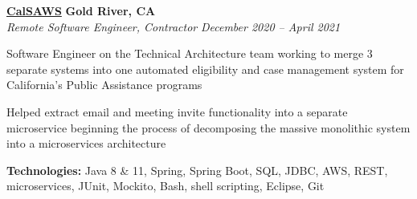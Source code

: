 %
    \headerrow
        {\textbf{\href{https://www.calsaws.org/}{CalSAWS}}}
        {\textbf{Gold River, CA}}
    \\
    \headerrow
        {\emph{Remote Software Engineer, Contractor}}
        {\emph{December 2020 -- April 2021}}
    \begin{itemize*}
        \item Software Engineer on the Technical Architecture team working to merge 3 separate systems into
            one automated eligibility and case management system for California's Public Assistance programs
        \item Helped extract email and meeting invite functionality into a separate microservice beginning the process of decomposing
            the massive monolithic system into a microservices architecture
    \end{itemize*}

    \hspace{1.0em}
        {\textbf{Technologies:} Java 8 \& 11, Spring, Spring Boot, SQL, JDBC, AWS, REST, microservices, JUnit, Mockito, Bash, shell scripting, Eclipse, Git}

